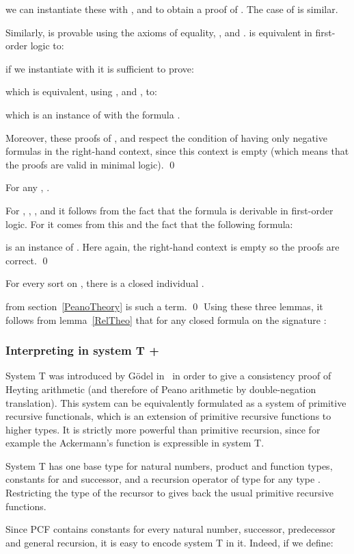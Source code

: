 \documentclass{CSML}
\begin{document}
we can instantiate these with ,  and  to obtain a proof of . The case of  is similar.\par
Similarly,  is provable using the axioms of equality, ,  and .  is equivalent in first-order logic to:

if we instantiate  with  it is sufficient to prove:

which is equivalent, using ,  and , to:

which is an instance of  with the formula .\par
Moreover, these proofs of ,  and  respect the condition of having only negative formulas in the right-hand context, since this context is empty (which means that the proofs are valid in minimal logic).
\qed
\begin{lem}
For any , .
\end{lem}
\proof
For , , ,  and  it follows from the fact that the formula  is derivable in first-order logic. For  it comes from this and the fact that the following formula:

is an instance of . Here again, the right-hand context is empty so the proofs are correct.
\qed
\begin{lem}
For every sort  on , there is a closed individual .
\end{lem}
\proof
 from section~\ref{PeanoTheory} is such a term.
\qed
Using these three lemmas, it follows from lemma~\ref{RelTheo} that for any closed formula  on the signature :

\subsubsection{Interpreting \texorpdfstring{}{PAomegar} in system T + \texorpdfstring{}{omega}}
\label{LmInterpPA}
System T was introduced by G\"odel in~\cite{GodelDialectica} in order to give a consistency proof of Heyting arithmetic (and therefore of Peano arithmetic by double-negation translation). This system can be equivalently formulated as a system of primitive recursive functionals, which is an extension of primitive recursive functions to higher types. It is strictly more powerful than primitive recursion, since for example the Ackermann's function is expressible in system T.\par
System T has one base type  for natural numbers, product and function types, constants for  and successor, and a recursion operator of type  for any type . Restricting the type of the recursor to  gives back the usual primitive recursive functions.\par
Since PCF contains constants for every natural number, successor, predecessor and general recursion, it is easy to encode system T in it. Indeed, if we define:
\end{document}
